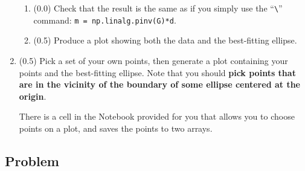 \documentclass[11pt,titlepage,fleqn]{article}
\begin{document}
\begin{enumerate}
\begin{enumerate}

\item (0.0) Check that the result is the same as if you simply use the ``\verb+\+'' command: \verb+m = np.linalg.pinv(G)*d+.

\item (0.5) Produce a plot showing both the data and the best-fitting ellipse.

\end{enumerate}


\item (0.5) Pick a set of your own points, then generate a plot containing your points and the best-fitting ellipse. Note that you should {\bf pick points that are in the vicinity of the boundary of some ellipse centered at the origin}.

There is a cell in the Notebook provided for you that allows you to choose points on a plot, and saves the points to two arrays.


\pagebreak

\end{enumerate}


\subsection*{Problem} \howmuchtime\




\end{document}
